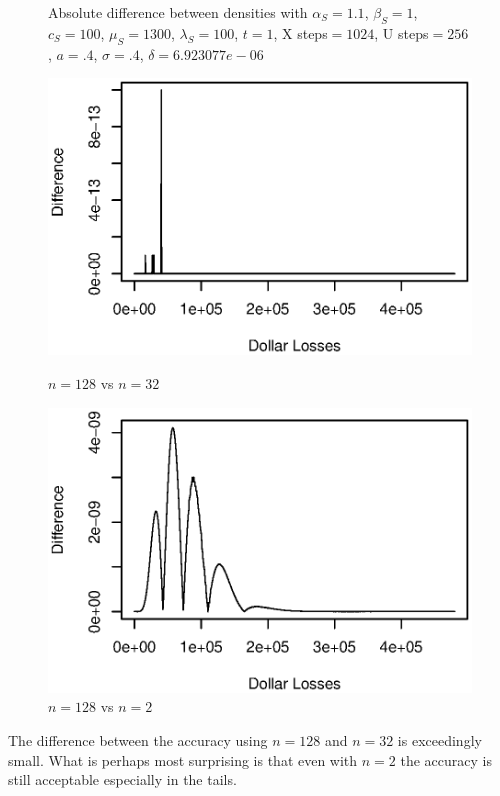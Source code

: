 \documentclass{article}
\theoremstyle{definition}
\begin{document}
\begin{figure}[H]
Absolute difference between densities with \(\alpha_S=1.1\), \(\beta_S=1\), \(c_S=100\), \(\mu_S=1300\), \(\lambda_S=100\),  \(t=1\), X steps\(=1024\), U steps\(=256\), \(a=.4\), \(\sigma=.4\), \(\delta=6.923077e-06\) 

\centering
\begin{minipage}{0.48\textwidth}
\centering
\includegraphics[width=1\textwidth]{Figure2}
\caption{\(n=128\) vs \(n=32\)}
\end{minipage}\hfill
\begin{minipage}{0.48\textwidth}
\centering
\includegraphics[width=1\textwidth]{Figure3}
\caption{\(n=128\) vs \(n=2\)}
\end{minipage}
\end{figure}

The difference between the accuracy using \(n=128\) and \(n=32\) is exceedingly small.  What is perhaps most surprising is that even with \(n=2\) the accuracy is still acceptable especially in the tails.  
\end{document}
